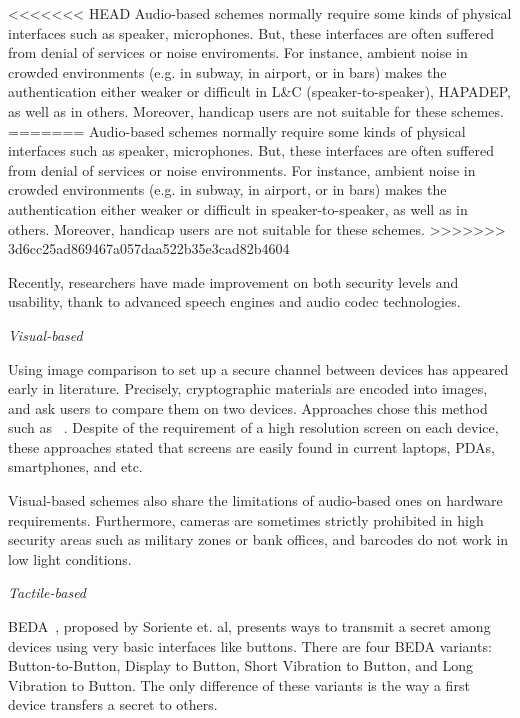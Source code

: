 <<<<<<< HEAD
Audio-based schemes normally require some kinds of physical interfaces such as speaker, microphones. But, these interfaces are often suffered from denial of services or noise enviroments. For instance, ambient noise in crowded environments (e.g. in subway, in airport, or in bars) makes the authentication either weaker or difficult in L\&C (speaker-to-speaker), HAPADEP, as well as in others. Moreover, handicap users are not suitable for these schemes. 
=======
Audio-based schemes normally require some kinds of physical interfaces such as speaker, microphones. But, these interfaces are often suffered from denial of services or noise environments. For instance, ambient noise in crowded environments (e.g. in subway, in airport, or in bars) makes the authentication either weaker or difficult in speaker-to-speaker, as well as in others. Moreover, handicap users are not suitable for these schemes. 
>>>>>>> 3d6cc25ad869467a057daa522b35e3cad82b4604

Recently, researchers have made improvement on both security levels and usability, thank to advanced speech engines and audio codec technologies. 

\emph{Visual-based}

Using image comparison to set up a secure channel between devices has appeared early in literature. Precisely, cryptographic materials are encoded into images, and ask users to compare them on two devices. Approaches chose this method such as ~\cite{Goodrich:2009:UAS:1509221.1509226,1425062,Perrig99hashvisualization,Ellison:2003:PSG:950191.950195,1624021}. Despite of the requirement of a high resolution screen on each device, these approaches stated that screens are easily found in current laptops, PDAs, smartphones, and etc. 

Visual-based schemes also share the limitations of audio-based ones on hardware requirements. Furthermore, cameras are sometimes strictly prohibited in high security areas such as military zones or bank offices, and barcodes do not work in low light conditions. 

\emph{Tactile-based}

BEDA~\cite{Soriente07beda:button-enabled}, proposed by Soriente et. al, presents ways to transmit a secret among devices using very basic interfaces like buttons. There are four BEDA variants: Button-to-Button, Display to Button, Short Vibration to Button, and Long Vibration to Button. The only difference of these variants is the way a first device transfers a secret to others. 

